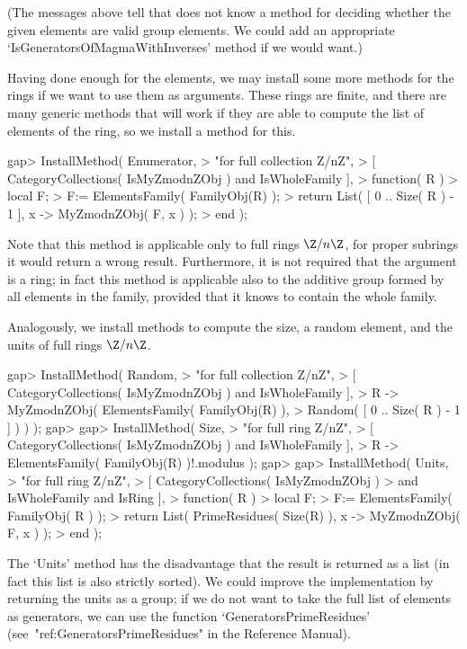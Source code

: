(The messages above tell that {\GAP} does not know a method for deciding
whether the given elements are valid group elements.
We could add an appropriate `IsGeneratorsOfMagmaWithInverses' method if
we would want.)

Having done enough for the elements,
we may install some more methods for the rings
if we want to use them as arguments.
These rings are finite,
and there are many generic methods that will work if they are able
to compute the list of elements of the ring,
so we install a method for this.

\beginexample
gap> InstallMethod( Enumerator,
>    "for full collection Z/nZ",
>    [ CategoryCollections( IsMyZmodnZObj ) and IsWholeFamily ],
>    function( R )
>    local F;
>    F:= ElementsFamily( FamilyObj(R) );
>    return List( [ 0 .. Size( R ) - 1 ], x -> MyZmodnZObj( F, x ) );
>    end );
\endexample

Note that this method is applicable only to full rings $\Z/n\Z$,
for proper subrings it would return a wrong result.
Furthermore, it is not required that the argument is a ring;
in fact this method is applicable also to the additive group
formed by all elements in the family,
provided that it knows to contain the whole family.

Analogously, we install methods to compute the size,
a random element, and the units of full rings $\Z/n\Z$.

\beginexample
gap> InstallMethod( Random,
>    "for full collection Z/nZ",
>    [ CategoryCollections( IsMyZmodnZObj ) and IsWholeFamily ],
>    R -> MyZmodnZObj( ElementsFamily( FamilyObj(R) ),
>                    Random( [ 0 .. Size( R ) - 1 ] ) ) );
gap> 
gap> InstallMethod( Size,
>    "for full ring Z/nZ",
>    [ CategoryCollections( IsMyZmodnZObj ) and IsWholeFamily ],
>    R -> ElementsFamily( FamilyObj(R) )!.modulus );
gap> 
gap> InstallMethod( Units,
>    "for full ring Z/nZ",
>    [     CategoryCollections( IsMyZmodnZObj )
>      and IsWholeFamily and IsRing ],
>    function( R )
>    local F;
>    F:= ElementsFamily( FamilyObj( R ) );
>    return List( PrimeResidues( Size(R) ), x -> MyZmodnZObj( F, x ) );
>    end );
\endexample

The `Units' method has the disadvantage that the result is returned
as a list (in fact this list is also strictly sorted).
We could improve the implementation by returning the units as a group;
if we do not want to take the full list of elements as generators,
we can use the function `GeneratorsPrimeResidues'
(see~"ref:GeneratorsPrimeResidues" in the Reference Manual).

